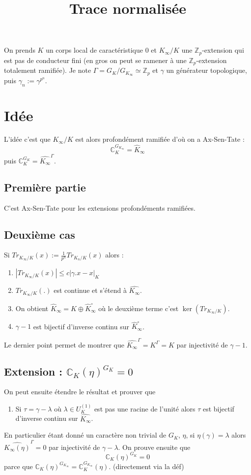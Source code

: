 \documentclass[a4paper,12pt]{article}
\title{Trace normalisée}
\date{}
\newcommand{\Z}{\mathbb{Z}}
\newcommand{\C}{\mathbb{C}}
\theoremstyle{plain}
\theoremstyle{definition}
\theoremstyle{remark}
\begin{document}
\maketitle
On prends $K$ un corps local de caractéristique $0$
et $K_\infty/K$ une $\Z_p$-extension qui est pas de
conducteur fini (en gros on peut se ramener à une
$\Z_p$-extension totalement ramifiée). Je note
$\Gamma = G_K/G_{K_\infty}\simeq \Z_p$ et $\gamma$
un générateur topologique, puis $\gamma_n:=\gamma^{p^n}$.

\section{Idée}
L'idée c'est que $K_\infty/K$ est alors profondément
ramifiée d'où on a Ax-Sen-Tate :
\[\C_K^{G_{K_\infty}}=\widehat K_\infty\]
puis $\C_K^{G_K}=\widehat{K_\infty}^\Gamma$.

\subsection{Première partie}
C'est Ax-Sen-Tate pour les extensions profondéments 
ramifiées.
\subsection{Deuxième cas}
Si $Tr_{K_\infty/K}(x):=\frac{1}{p^n}Tr_{K_n/K}(x)$
alors :
\begin{enumerate}
  \item $|Tr_{K_\infty/K}(x)|\leq c|\gamma.x-x|_K$
  \item $Tr_{K_\infty/K}(.)$ est continue et s'étend à $\widehat{K_\infty}$.
  \item On obtient $\widehat K_\infty=K\oplus \widehat K_\infty^\circ$ où
    le deuxième terme c'est $\ker(Tr_{K_\infty/K})$.
  \item $\gamma-1$ est bijectif d'inverse continu sur $\widehat K_\infty^\circ$.
\end{enumerate}
Le dernier point permet de montrer que 
$\widehat{K_\infty}^\Gamma = K^\Gamma=K$
par injectivité de $\gamma-1$.

\subsection{Extension : $\C_K(\eta)^{G_K}=0$}
On peut ensuite étendre le résultat et prouver que
\begin{enumerate}
  \item Si $\tau = \gamma -\lambda$ où $\lambda\in U_K^{(1)}$ est
    pas une racine de l'unité alors $\tau$ est bijectif d'inverse
    continu sur $\widehat{K_\infty}$.
\end{enumerate}
En particulier étant donné un caractère non trivial de 
$G_K$, $\eta$, si $\eta(\gamma)=\lambda$ alors 
$\widehat{K_\infty(\eta)}^\Gamma=0$ par injectivité de
$\gamma-\lambda$. On prouve ensuite que
\[\C_K(\eta)^{G_K}=0\]
parce que 
$\C_K(\eta)^{G_{K_\infty}}=\C_K^{G_{K_\infty}}(\eta)$.
(directement via la déf)
\end{document}
